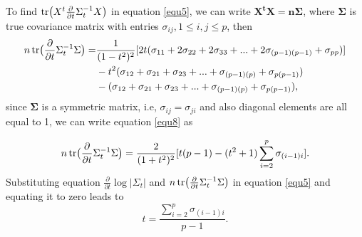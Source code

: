 To find $\mbox{tr} \big( X^t \frac{\partial}{\partial t} \Sigma_{t}^{-1} X \big )$ in equation \ref{equ5}, we can write $\boldsymbol{X^t X = n \Sigma}$, where $\boldsymbol{\Sigma}$ is true covariance matrix with entries $\sigma_{ij}, 1 \le i,j \le p$, then
\begin{equation}
\begin{split}
n \, \tr \big ( \frac{\partial}{\partial t} \Sigma_{t}^{-1} \Sigma \big )= &\frac{1}{(1-t^2)^2} [ 2t(\sigma_{11} + 2\sigma_{22} + 2\sigma_{33} + ... + 2\sigma_{(p-1)(p-1)} + \sigma_{pp})]\\
& - t^2(\sigma_{12} + \sigma_{21} + \sigma_{23} + ... + \sigma_{(p-1)(p)} + \sigma_{p(p-1)})\\
& - (\sigma_{12} + \sigma_{21} + \sigma_{23} + ... + \sigma_{(p-1)(p)} + \sigma_{p(p-1)}),
\end{split}
\label{equ8}
\end{equation}
since $\boldsymbol{\Sigma}$ is a symmetric matrix, i.e, $\sigma_{ij}=\sigma_{ji}$ and also diagonal elements are all equal to 1, we can write equation \ref{equ8} as

\begin{equation}
n \, \tr \big ( \frac{\partial}{\partial t} \Sigma_{t}^{-1} \Sigma \big ) =\frac{2}{(1+t^2)^2} [t(p-1) - (t^2 + 1) \sum_{i=2}^{p} \sigma_{(i-1)i}].
\label{equ9}
\end{equation}
Substituting equation $\frac{\partial}{\partial t} \log |\Sigma_{t}|$ and $n \, \mbox{tr} \big ( \frac{\partial}{\partial t} \Sigma_{t}^{-1} \Sigma \big )$ in equation \ref{equ5} and equating it to zero leads to
 \begin{equation}
 t = \frac{\sum_{i=2}^{p} \sigma_{(i-1)i}}{p-1}.
 \label{equ11}
 \end{equation}
 
